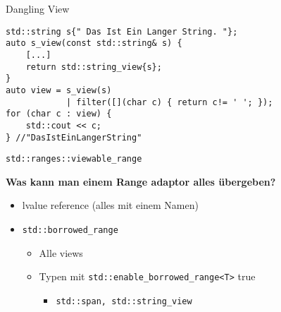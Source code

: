 \begin{frame}[fragile]{Dangling View}
    \begin{verbatim}
std::string s{" Das Ist Ein Langer String. "};
auto s_view(const std::string& s) {
    [...]
    return std::string_view{s};
}
auto view = s_view(s)
            | filter([](char c) { return c!= ' '; });
for (char c : view) {
    std::cout << c;
} //"DasIstEinLangerString"
    \end{verbatim}
\end{frame}

\begin{frame}{\texttt{std::ranges::viewable_range}}
    \begin{center}
        \textbf{Was kann man einem Range adaptor alles übergeben?}
    \end{center}

    \vspace{2.5em}


    \begin{itemize}
        \item<3-> lvalue reference (alles mit einem Namen)
        \item<4-> \texttt{std::borrowed_range}
            \begin{itemize}
                \item<5-> Alle views
                \item<6-> Typen mit \texttt{std::enable_borrowed_range<T>} true
                    \begin{itemize}
                        \item<7-> \texttt{std::span, std::string_view}
                    \end{itemize}
            \end{itemize}
    \end{itemize}
\end{frame}
